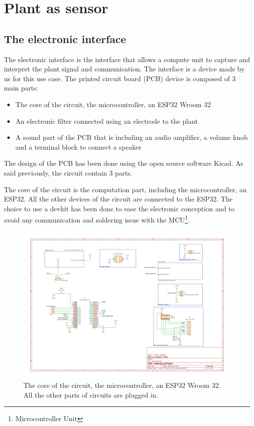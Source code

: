 \section{Plant as sensor}

\subsection{The electronic interface}

The electronic interface is the interface that allows a compute unit to capture and interpret the plant signal and
communication. The interface is a device made by us for this use case. The printed circuit board (PCB)
device is composed of 3 main parts:
\begin{itemize}
    \item The core of the circuit, the microcontroller, an ESP32 Wroom 32
    \item An electronic filter connected using an electrode to the plant
    \item A sound part of the PCB that is including an audio amplifier, a volume knob and a terminal block to connect a speaker
\end{itemize}

The design of the PCB has been done using the open source software Kicad.
As said previously, the circuit contain 3 parts.

The core of the circuit is the computation part, including the microcontroller, an ESP32. All the other
devices of the circuit are connected to the ESP32. The choice to use a devkit has been done 
to ease the electronic conception and to avoid any communication and soldering issue with the MCU\footnote[1]{Microcontroller Unit}.

\begin{figure}[h]
    \centering
    \includegraphics[width=\textwidth]{images/iop.pdf}
    \caption{The core of the circuit, the microcontroller, an ESP32 Wroom 32. All the other parts of
    circuits are plugged in.} 
    \vspace{0.1cm}
    \label{fig:iop_schematic_main}
\end{figure}


